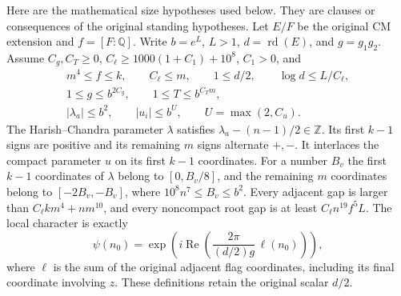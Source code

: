 Here are the mathematical size hypotheses used below.  They are
clauses or consequences of the original standing hypotheses.
Let $E/F$ be the original CM extension and $f=[F:\mathbb Q]$.
Write $b=e^L$, $L>1$, $d=\operatorname{rd}(E)$, and $g=g_1g_2$.
Assume $C_g,C_T\ge0$, $C_\ell\ge1000(1+C_1)+10^8$,
$C_1>0$, and
\begin{gather*}
 m^4\le f\le k,\qquad C_\ell\le m,\qquad
 1\le d/2,\qquad \log d\le L/C_\ell,\\
 1\le g\le b^{2C_g},\qquad 1\le T\le b^{C_Tm},\\
 |\lambda_a|\le b^2,\qquad |u_i|\le b^U,
                    \qquad U=\max(2,C_u).
\end{gather*}
The Harish--Chandra parameter $\lambda$ satisfies
$\lambda_a-(n-1)/2\in\mathbb Z$.  Its first $k-1$ signs are
positive and its remaining $m$ signs alternate $+,-$.
It interlaces the compact parameter $u$ on its first $k-1$
coordinates.  For a
number $B_v$ the first $k-1$ coordinates of $\lambda$ belong
to $[0,B_v/8]$, and the remaining $m$ coordinates belong to
$[-2B_v,-B_v]$, where $10^8n^7\le B_v\le b^2$.
Every adjacent gap is larger than $C_\ell k m^4+n m^{10}$,
and every noncompact root gap is at least $C_\ell n^{19}f^5L$.
The local character is exactly
\[
 \psi(n_0)=\exp\left(i\operatorname{Re}
                 \left(\frac{2\pi}{(d/2)g}\,\ell(n_0)\right)\right),
\]
where $\ell$ is the sum of the original adjacent flag coordinates,
including its final coordinate involving $z$.
These definitions retain the original scalar $d/2$.
\cite{global-gram-length-tail-source}

